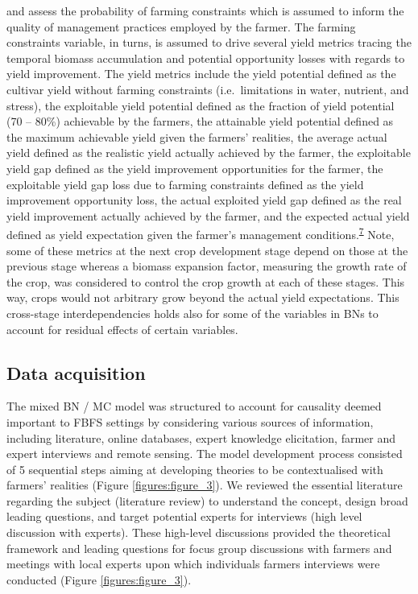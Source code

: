 \documentclass[12pt,oneside]{article}
\begin{document}
and assess the probability of farming constraints which is assumed to
inform the quality of management practices employed by the farmer. The
farming constraints variable, in turns, is assumed to drive several
yield metrics tracing the temporal biomass accumulation and potential
opportunity losses with regards to yield improvement. The yield metrics
include the yield potential defined as the cultivar yield without
farming constraints (i.e.~limitations in water, nutrient, and stress),
the exploitable yield potential defined as the fraction of yield
potential (70 -- 80\%) achievable by the farmers, the attainable yield
potential defined as the maximum achievable yield given the farmers'
realities, the average actual yield defined as the realistic yield
actually achieved by the farmer, the exploitable yield gap defined as
the yield improvement opportunities for the farmer, the exploitable
yield gap loss due to farming constraints defined as the yield
improvement opportunity loss, the actual exploited yield gap defined as
the real yield improvement actually achieved by the farmer, and the
expected actual yield defined as yield expectation given the farmer's
management
conditions.\textsuperscript{\protect\hyperlink{ref-VanIttersum_et_al_2013}{7}}
Note, some of these metrics at the next crop development stage depend on
those at the previous stage whereas a biomass expansion factor,
measuring the growth rate of the crop, was considered to control the
crop growth at each of these stages. This way, crops would not arbitrary
grow beyond the actual yield expectations. This cross-stage
interdependencies holds also for some of the variables in BNs to account
for residual effects of certain variables.

\hypertarget{data-acquisition}{%
\subsection{Data acquisition}\label{data-acquisition}}

The mixed BN / MC model was structured to account for causality deemed
important to FBFS settings by considering various sources of
information, including literature, online databases, expert knowledge
elicitation, farmer and expert interviews and remote sensing. The model
development process consisted of 5 sequential steps aiming at developing
theories to be contextualised with farmers' realities (Figure
\ref{figures:figure_3}). We reviewed the essential literature regarding
the subject (literature review) to understand the concept, design broad
leading questions, and target potential experts for interviews (high
level discussion with experts). These high-level discussions provided
the theoretical framework and leading questions for focus group
discussions with farmers and meetings with local experts upon which
individuals farmers interviews were conducted (Figure
\ref{figures:figure_3}).
\end{document}
